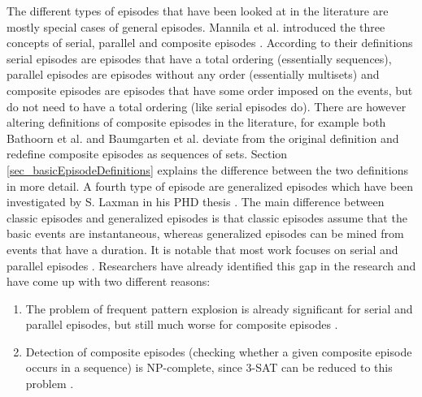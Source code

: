 The different types of episodes that have been looked at in the literature are mostly special cases of general episodes. Mannila et al. introduced the three concepts of serial, parallel and composite episodes \cite{mannila1995discovering}. According to their definitions serial episodes are episodes that have a total ordering (essentially sequences), parallel episodes are episodes without any order (essentially multisets) and composite episodes are episodes that have some order imposed on the events, but do not need to have a total ordering (like serial episodes do). There are however altering definitions of composite episodes in the literature, for example both Bathoorn et al. \cite{bathoorn2007finding} and Baumgarten et al. \cite{baumgarten2003tree} deviate from the original definition and redefine composite episodes as sequences of sets. Section \ref{sec_basicEpisodeDefinitions} explains the difference between the two definitions in more detail. A fourth type of episode are generalized episodes which have been investigated by S. Laxman in his PHD thesis \cite{laxman2006discovering}. The main difference between classic episodes and generalized episodes is that classic episodes assume that the basic events are instantaneous, whereas generalized episodes can be mined from events that have a duration. It is notable that most work focuses on serial and parallel episodes \cite{mannila1995discovering} \cite{mannila1997discovery} \cite{laxman2006discovering} \cite{laxman2007fast}. Researchers have already identified this gap in the research and have come up with two different reasons:
\begin{enumerate}
	\item The problem of frequent pattern explosion is already significant for serial and parallel episodes, but still much worse for composite episodes \cite{bathoorn2007finding}.
	\item Detection of composite episodes (checking whether a given composite episode occurs in a sequence) is NP-complete, since 3-SAT can be reduced to this problem \cite{tatti2011mining}.
\end{enumerate}

